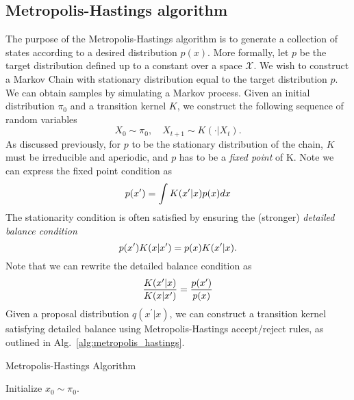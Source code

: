 \documentclass[../main.tex]{subfiles}
\begin{document}
\subsection{Metropolis-Hastings algorithm}
The purpose of the Metropolis-Hastings algorithm is to generate a collection of states according to a desired
distribution $p(x)$.
%
More formally, let $p$ be the target distribution defined up to a constant over a space $\mathcal{X}$.
%
We wish to construct a Markov Chain with stationary distribution equal to the target distribution $p$.
%
We can obtain samples by simulating a Markov process.
%
Given an initial distribution $\pi_0$ and a transition kernel $K$, we construct the following sequence of random
variables
%
\begin{equation}
  X_0 \sim \pi_0, \quad X_{t+1} \sim K(\cdot|X_t).
\end{equation}
%
As discussed previously, for $p$ to be the stationary distribution of the chain, $K$ must be irreducible and aperiodic,
and $p$ has to be a \emph{fixed point} of K. Note we can express the fixed point condition as 
%
\begin{equation}
  p({x^{\prime}}) = \int K({x^{\prime}} | x) p(x) dx
\end{equation}
%
The stationarity condition is often satisfied by ensuring the (stronger) \emph{detailed balance condition}
%
\begin{equation}
  p{({x^{\prime}})} K{(x|{x^{\prime}})} = p{(x)} K{({x^{\prime}}|x)}.
\end{equation}
%
Note that we can rewrite the detailed balance condition as 
%
\begin{equation}
  \frac{K{({x^{\prime}} | x)}}{K(x | {x^{\prime}})} = \frac{p({x^{\prime}})}{p(x)}
\end{equation}
%
Given a proposal distribution $q{(x^{\prime}|x)}$, we can construct a transition kernel satisfying detailed balance
using Metropolis-Hastings accept/reject rules, as outlined in Alg.~\ref{alg:metropolis_hastings}.
%
\begin{algorithm}[htpb]%
\label{alg:metropolis_hastings}
  \AlgoDontDisplayBlockMarkers\SetAlgoNoEnd\SetAlgoNoLine%
  \DontPrintSemicolon%
  \caption{Metropolis-Hastings Algorithm}%
  \;
  Initialize $x_0 \sim \pi_0$.\;
\end{algorithm}
\end{document}
